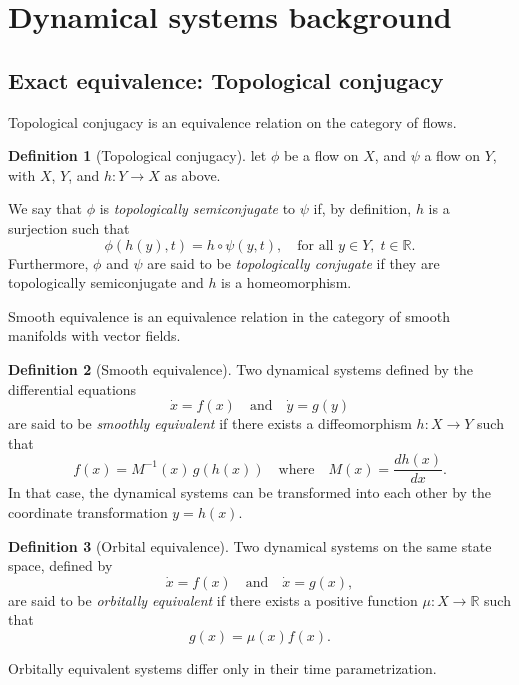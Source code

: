 \documentclass{article}
\theoremstyle{definition} \newtheorem{definition}{Definition}  \newtheorem{example}{Example}
\theoremstyle{remark} \newtheorem{remark}{Remark}
\newcounter{ct}
\begin{document}
\newpage
\section{Dynamical systems background}

%


\subsection{Exact equivalence: Topological conjugacy}\label{sec:top_conj}

Topological conjugacy is an equivalence relation on the category of flows. %
\begin{definition}[Topological conjugacy]\label{def:top_conj}
let $\phi$ be a flow on $X$, and $\psi$ a flow on $Y$, with $X$, $Y$, and $h\colon Y \to X$ as above.

We say that $\phi$ is \emph{topologically semiconjugate} to $\psi$ if, by definition, $h$ is a surjection such that
\[
\phi(h(y), t) = h \circ \psi(y, t), \quad \text{for all } y \in Y, \; t \in \mathbb{R}.
\]
Furthermore, $\phi$ and $\psi$ are said to be \emph{topologically conjugate} if they are topologically semiconjugate and $h$ is a homeomorphism.
\end{definition}

Smooth equivalence is an equivalence relation in the category of smooth manifolds with vector fields. %
\begin{definition}[Smooth equivalence]\label{def:smooth_equivalence}
Two dynamical systems defined by the differential equations 
\[
\dot{x} = f(x) \quad \text{and} \quad \dot{y} = g(y)
\]
are said to be \emph{smoothly equivalent} if there exists a diffeomorphism \( h \colon X \to Y \) such that
\[
f(x) = M^{-1}(x) \, g(h(x)) \quad \text{where} \quad M(x) = \frac{d h(x)}{d x}.
\]
In that case, the dynamical systems can be transformed into each other by the coordinate transformation \( y = h(x) \).
\end{definition}

\begin{definition}[Orbital equivalence]
Two dynamical systems on the same state space, defined by 
\[
\dot{x} = f(x) \quad \text{and} \quad \dot{x} = g(x),
\]
are said to be \emph{orbitally equivalent} if there exists a positive function \( \mu \colon X \to \mathbb{R} \) such that
\[
g(x) = \mu(x) f(x).
\]
\end{definition}
Orbitally equivalent systems differ only in their time parametrization.
\end{document}
